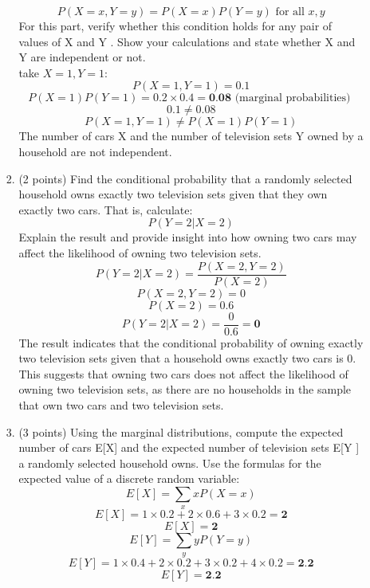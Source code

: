 \documentclass[a3paper,12pt]{article} %
\begin{document}
\begin{enumerate}
\begin{enumerate}
\begin{enumerate}
        \[
            P(X = x, Y = y) = P(X = x)P(Y = y) \text{ for all } x, y
        \]
        For this part, verify whether this condition holds for any pair of values of X and Y . Show
        your calculations and state whether X and Y are independent or not.
        \\ take \(X = 1, Y = 1\):
        \[
            P(X = 1, Y = 1) = 0.1
        \]
        \[
            P(X = 1)P(Y = 1) = 0.2 \times 0.4 = \textbf{0.08} \text{ (marginal probabilities) }
        \]
        \[
            0.1 \neq 0.08
        \]
        \[
            P(X = 1, Y = 1) \neq P(X = 1)P(Y = 1)
        \]
        The number of cars X and the number of television sets Y owned by a household are not independent.
        \item (2 points) Find the conditional probability that a randomly selected household owns
        exactly two television sets given that they own exactly two cars. That is, calculate:
        \[
            P(Y = 2 |X = 2)
        \]
        Explain the result and provide insight into how owning two cars may affect the likelihood of
        owning two television sets.
        \[
            P(Y = 2 |X = 2) = \frac{P(X = 2, Y = 2)}{P(X = 2)}
        \]
        \[
            P(X = 2, Y = 2) = 0
        \]
        \[
            P(X = 2) = 0.6
        \]
        \[
            P(Y = 2 |X = 2) = \frac{0}{0.6} = \textbf{0}
        \]
        The result indicates that the conditional probability of owning exactly two television sets given that a household owns exactly two cars is 0. This suggests that owning two cars does not affect the likelihood of owning two television sets, as there are no households in the sample that own two cars and two television sets.
        \item (3 points) Using the marginal distributions, compute the expected number of cars E[X]
        and the expected number of television sets E[Y ] a randomly selected household owns. Use
        the formulas for the expected value of a discrete random variable:
        \[
            E[X] = \sum_{x} xP(X = x)
        \]
        \[
            E[X] = 1 \times 0.2 + 2 \times 0.6 + 3 \times 0.2 = \textbf{2}
        \]
        \[
            E[X] = \textbf{2}
        \]
        \[
            E[Y] = \sum_{y} yP(Y = y)
        \]
        \[
            E[Y] = 1 \times 0.4 + 2 \times 0.2 + 3 \times 0.2 + 4 \times 0.2 = \textbf{2.2}
        \]
        \[
            E[Y] = \textbf{2.2}
        \]


\end{enumerate}
\end{enumerate}
\end{enumerate}
\end{document}
